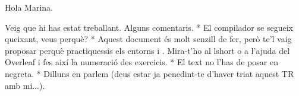 Hola Marina.

Veig que hi has estat treballant. Alguns comentaris. 
* El compilador se segueix queixant, veus perquè? 
* Aquest document és molt senzill de fer, però te'l vaig proposar perquè practiquessis els entorns \enumerate i \itemize. Mira-t'ho al lshort o a l'ajuda del Overleaf i fes així la numeració des exercicis.
* El text no l'has de posar en negreta. 
* Dilluns en parlem (deus estar ja penedint-te d'haver triat aquest TR amb mi...).
